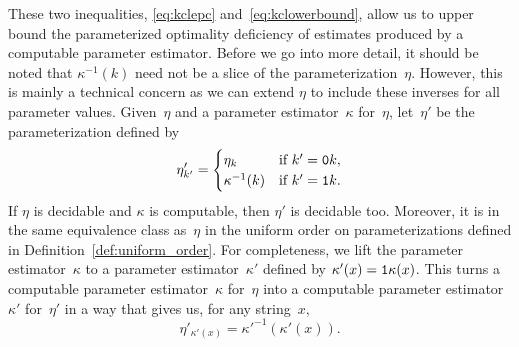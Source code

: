 These two inequalities, \eqref{eq:kclepc} and~\eqref{eq:kclowerbound}, allow us to upper bound the parameterized optimality deficiency of estimates produced by a computable parameter estimator.
Before we go into more detail, it should be noted that $\kappa^{-1}(k)$ need not be a slice of the parameterization~$\eta$.
However, this is mainly a technical concern as we can extend $\eta$ to include these inverses for all parameter values.
Given~$\eta$ and a parameter estimator~$\kappa$ for~$\eta$, let~$\eta'$ be the parameterization defined by
\begin{equation*}
  \eta'_{k'} = \begin{cases}
    \eta_k	&\text{if $k' = \textnormal{\texttt{0}}k$}, \\
    \kappa^{-1}(k)	&\text{if $k' = \textnormal{\texttt{1}}k$}.
  \end{cases}
\end{equation*}
If $\eta$ is decidable and $\kappa$ is computable, then $\eta'$ is decidable too.
Moreover, it is in the same equivalence class as~$\eta$ in the uniform order on parameterizations defined in Definition~\ref{def:uniform_order}.
For completeness, we lift the parameter estimator~$\kappa$ to a parameter estimator~$\kappa'$ defined by $\kappa'(x) = \textnormal{\texttt{1}}\kappa(x)$.
This turns a computable parameter estimator~$\kappa$ for~$\eta$ into a computable parameter estimator~$\kappa'$ for~$\eta'$ in a way that gives us, for any string~$x$,
\begin{equation*}
  \eta'_{\kappa'(x)} = \kappa'^{-1}(\kappa'(x)).
\end{equation*}

